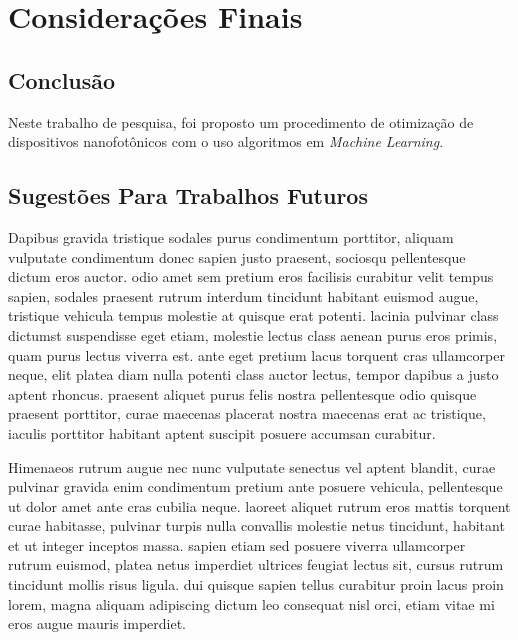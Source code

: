 \chapter{Considerações Finais}      \label{Consideracoes Finais}

\section{Conclusão}

Neste trabalho de pesquisa, foi proposto um procedimento de otimização de dispositivos nanofotônicos com o uso algoritmos em \textit{Machine Learning}.



\section{Sugestões Para Trabalhos Futuros}

Dapibus gravida tristique sodales purus condimentum porttitor, aliquam vulputate condimentum donec sapien justo praesent, sociosqu pellentesque dictum eros auctor. odio amet sem pretium eros facilisis curabitur velit tempus sapien, sodales praesent rutrum interdum tincidunt habitant euismod augue, tristique vehicula tempus molestie at quisque erat potenti. lacinia pulvinar class dictumst suspendisse eget etiam, molestie lectus class aenean purus eros primis, quam purus lectus viverra est. ante eget pretium lacus torquent cras ullamcorper neque, elit platea diam nulla potenti class auctor lectus, tempor dapibus a justo aptent rhoncus. praesent aliquet purus felis nostra pellentesque odio quisque praesent porttitor, curae maecenas placerat nostra maecenas erat ac tristique, iaculis porttitor habitant aptent suscipit posuere accumsan curabitur. 

Himenaeos rutrum augue nec nunc vulputate senectus vel aptent blandit, curae pulvinar gravida enim condimentum pretium ante posuere vehicula, pellentesque ut dolor amet ante cras cubilia neque. laoreet aliquet rutrum eros mattis torquent curae habitasse, pulvinar turpis nulla convallis molestie netus tincidunt, habitant et ut integer inceptos massa. sapien etiam sed posuere viverra ullamcorper rutrum euismod, platea netus imperdiet ultrices feugiat lectus sit, cursus rutrum tincidunt mollis risus ligula. dui quisque sapien tellus curabitur proin lacus proin lorem, magna aliquam adipiscing dictum leo consequat nisl orci, etiam vitae mi eros augue mauris imperdiet.